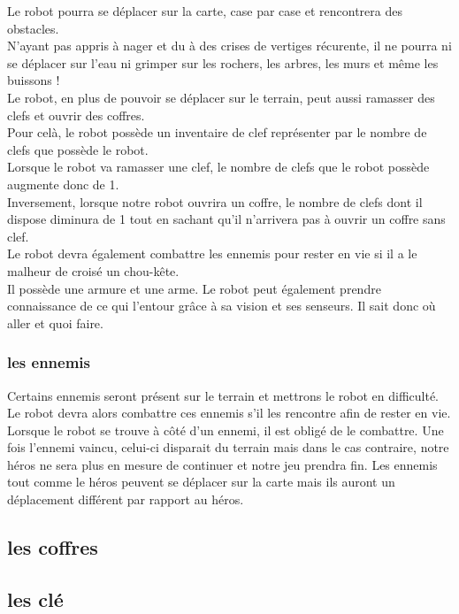 \documentclass[a4paper 12pts]{article}
\begin{document}
Le robot pourra se déplacer sur la carte, case par case et rencontrera des obstacles. \\
N'ayant pas appris à nager et du à des crises de vertiges récurente, il ne pourra ni se déplacer sur l'eau ni grimper sur les rochers,
les arbres, les murs et même les buissons !\\
Le robot, en plus de pouvoir se déplacer sur le terrain, peut aussi ramasser des clefs et ouvrir des coffres.\\
Pour celà, le robot possède un inventaire de clef représenter par le nombre de clefs que possède le robot.\\
Lorsque le robot va ramasser une clef, le nombre de clefs que le robot possède augmente donc de 1.\\
Inversement, lorsque notre robot ouvrira un coffre, le nombre de clefs dont il dispose diminura de 1 tout en sachant qu'il n'arrivera pas à ouvrir un coffre sans clef.\\
Le robot devra également combattre les ennemis pour rester en vie si il a le malheur de croisé un chou-kête.\\
Il possède une armure et une arme.
Le robot peut également prendre connaissance de ce qui l'entour grâce à sa vision et ses senseurs. Il sait donc où aller et quoi faire.


\subsubsection{les ennemis}


Certains ennemis seront présent sur le terrain et mettrons le robot en difficulté. 
Le robot devra alors combattre ces ennemis s'il les rencontre afin de rester en vie.
Lorsque le robot se trouve à côté d'un ennemi, il est obligé de le combattre. 
Une fois l'ennemi vaincu, celui-ci disparait du terrain mais dans le cas contraire, 
notre héros ne sera plus en mesure de continuer et notre jeu prendra fin.
Les ennemis tout comme le héros peuvent se déplacer sur la carte mais ils auront un déplacement différent par rapport au héros.



\subsection{les coffres}

\subsection{les clé}
\end{document}
